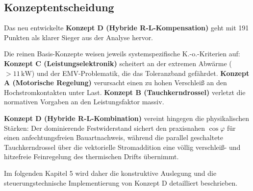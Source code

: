 \subsection{Konzeptentscheidung}
\label{sec:entscheidung}

Das neu entwickelte \textbf{Konzept D (Hybride R-L-Kompensation)} geht mit 191 Punkten als klarer Sieger aus der Analyse hervor. 

Die reinen Basis-Konzepte weisen jeweils systemspezifische K.-o.-Kriterien auf: \textbf{Konzept C (Leistungselektronik)} scheitert an der extremen Abwärme ($> 11\,\text{kW}$) und der EMV-Problematik, die das Toleranzband gefährdet. \textbf{Konzept A (Motorische Regelung)} verursacht einen zu hohen Verschleiß an den Hochstromkontakten unter Last. \textbf{Konzept B (Tauchkerndrossel)} verletzt die normativen Vorgaben an den Leistungsfaktor massiv.

\textbf{Konzept D (Hybride R-L-Kombination)} vereint hingegen die physikalischen Stärken: Der dominierende Festwiderstand sichert den praxisnahen $\cos\varphi$ für einen anfechtungsfreien Bauartnachweis, während die parallel geschaltete Tauchkerndrossel über die vektorielle Stromaddition eine völlig verschleiß- und hitzefreie Feinregelung des thermischen Drifts übernimmt. 

Im folgenden Kapitel 5 wird daher die konstruktive Auslegung und die steuerungstechnische Implementierung von Konzept D detailliert beschrieben.
